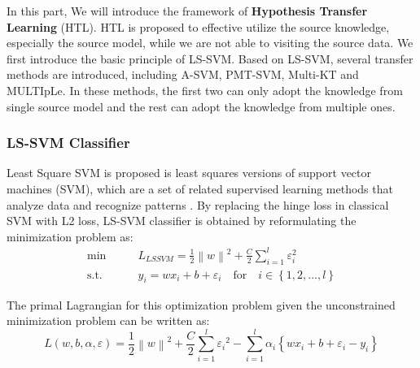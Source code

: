 In this part, We will introduce the framework of \textbf{Hypothesis Transfer Learning} (HTL). HTL is proposed to effective utilize the source knowledge, especially the source model, while we are not able to visiting the source data. We first introduce the basic principle of LS-SVM. Based on LS-SVM, several transfer methods are introduced, including A-SVM, PMT-SVM, Multi-KT and MULTIpLe. In these methods, the first two can only adopt the knowledge from single source model and the rest can adopt the knowledge from multiple ones.

\subsubsection{LS-SVM Classifier}

Least Square SVM is proposed is least squares versions of support vector machines (SVM), which are a set of related supervised learning methods that analyze data and recognize patterns \cite{suykens1999least}. By replacing the hinge loss in classical SVM with L2 loss, LS-SVM classifier is obtained by reformulating the minimization problem as: 
\begin{equation}\label{eq:gama:lssvm}
\begin{aligned}
\min \qquad& L_{LSSVM} = \frac{1}{2}{\left\| w \right\|^2} + \frac{C}{2}\sum\limits_{i = 1}^l {{\varepsilon_i ^2}}\\
\text{s.t.}\qquad&{y_i} = w{x_i} + b + {\varepsilon _i} \quad   \text{for} \quad i \in \left\{ {1,2,...,l} \right\}
\end{aligned}
\end{equation}

The primal Lagrangian for this optimization problem given the unconstrained minimization problem can be written as:
\begin{equation}\label{sq:gama:lsprime}
  L\left( {w,b,\alpha ,\varepsilon } \right) = \frac{1}{2}{\left\| w \right\|^2} + \frac{C}{2}\sum\limits_{i = 1}^l {{\varepsilon _i}^2}  - \sum\limits_{i = 1}^l {{\alpha _i}\left\{ {w{x_i} + b + {\varepsilon _i} - {y_i}} \right\}}
\end{equation}

